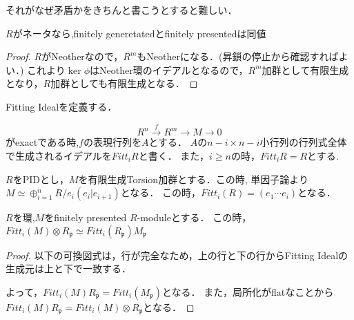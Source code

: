 \documentclass{ujarticle}
\begin{document}
\begin{rem}
   それがなぜ矛盾かをきちんと書こうとすると難しい．
\end{rem}

\begin{lem}
 $R$がネータなら,finitely generetatedとfinitely presentedは同値
\end{lem}
\begin{proof}
 $R$がNeotherなので，$R^m$もNeotherになる．(昇鎖の停止から確認すればよい．)
 これより$\ker \phi$はNeother環のイデアルとなるので，$R^m$加群として有限生成となり，$R$加群としても有限生成となる．
\end{proof}

Fitting Idealを定義する．
\begin{dfn}
  \begin{equation*}
   R^n \xrightarrow{f} R^m  \to M \to 0
  \end{equation*}
がexactである時,$f$の表現行列を$A$とする．
$A$の$n-i \times n-i$小行列の行列式全体で生成されるイデアルを$Fitt_iR$と書く．
また，$i \ge n$の時，$Fitt_iR=R$とする.
\end{dfn}

\begin{epl}
 $R$をPIDとし，$M$を有限生成Torsion加群とする．この時,
  単因子論より$M \simeq \oplus_{i=1}^n R/e_i (e_i | e_{i+1})$となる．
  この時，$Fitt_i(R)=(e_1 \cdots e_i)$となる．
\end{epl}


\begin{prop}
 $R$を環,$M$をfinitely presented $R$-moduleとする．
 この時，$Fitt_i(M) \otimes R_{\mathfrak{p}} \simeq  Fitt_i(R_{\mathfrak{p}})M_{\mathfrak{p}}$
\end{prop}

\begin{proof}
以下の可換図式は，行が完全なため，上の行と下の行からFitting Idealの生成元は上と下で一致する．


よって，$Fitt_i(M)R_{\mathfrak{p}}=Fitt_i(M_{\mathfrak{p}})$となる．
また，局所化がflatなことから$Fitt_i(M)R_{\mathfrak{p}}=Fitt_i(M) \otimes R_{\mathfrak{p}}$となる．

\end{proof}
\end{document}
